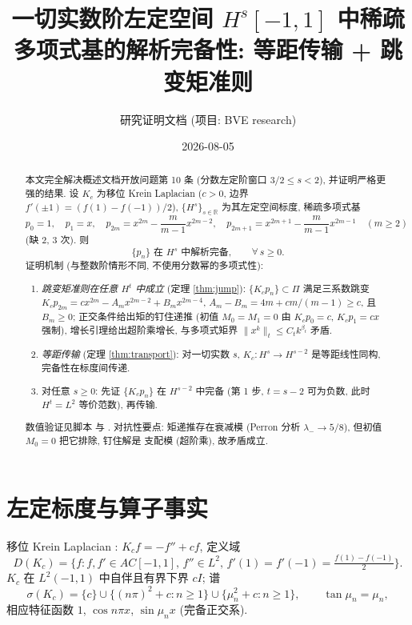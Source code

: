 \documentclass[UTF8]{ctexart}
\title{一切实数阶左定空间 $H^s[-1,1]$ 中稀疏多项式基的解析完备性: 等距传输 + 跳变矩准则}
\author{研究证明文档 (项目: BVE research)}
\date{2026-08-05}
\begin{document}
\maketitle

\begin{abstract}
本文完全解决概述文档开放问题第 10 条 (分数左定阶窗口 $3/2 \le s < 2$),
并证明严格更强的结果. 设 $K_c$ 为移位 Krein Laplacian ($c > 0$,
边界 $f'(\pm1) = (f(1)-f(-1))/2$), $\{H^s\}_{s \in \mathbb R}$ 为其左定空间标度,
稀疏多项式基
\[
	p_0 = 1, \quad p_1 = x, \quad
	p_{2m} = x^{2m} - \frac{m}{m-1}x^{2m-2}, \quad
	p_{2m+1} = x^{2m+1} - \frac{m}{m-1}x^{2m-1} \quad (m \ge 2)
\]
(缺 2, 3 次). 则
\begin{equation}
	\{p_n\} \text{ 在 } H^s \text{ 中解析完备}, \qquad \forall\, s \ge 0.
\end{equation}
证明机制 (与整数阶情形不同, 不使用分数幂的多项式性):
\begin{enumerate}
	\item \emph{跳变矩准则在任意 $H^t$ 中成立} (定理 \ref{thm:jump}):
		$\{K_c p_n\} \subset \Pi$ 满足三系数跳变
		$K_c p_{2m} = c x^{2m} - A_m x^{2m-2} + B_m x^{2m-4}$,
		$A_m - B_m = 4m + cm/(m-1) \ge c$, 且 $B_m \ge 0$;
		正交条件给出矩的钉住递推 (初值 $M_0 = M_1 = 0$ 由
		$K_c p_0 = c$, $K_c p_1 = cx$ 强制), 增长引理给出超阶乘增长,
		与多项式矩界 $\|x^k\|_t \le C_t k^{\beta_t}$ 矛盾.
	\item \emph{等距传输} (定理 \ref{thm:transport}): 对一切实数 $s$,
		$K_c: H^s \to H^{s-2}$ 是等距线性同构, 完备性在标度间传递.
	\item 对任意 $s \ge 0$: 先证 $\{K_c p_n\}$ 在 $H^{s-2}$ 中完备 (第 1 步,
		$t = s-2$ 可为负数, 此时 $H^t = L^2$ 等价范数), 再传输.
\end{enumerate}
数值验证见脚本  与
. 对抗性要点: 矩递推存在衰减模
(Perron 分析 $\lambda_- \to 5/8$), 但初值 $M_0 = 0$ 把它排除, 钉住解是
支配模 (超阶乘), 故矛盾成立.
\end{abstract}

\tableofcontents

\section{左定标度与算子事实}

移位 Krein Laplacian \cite{axioms}: $K_c f = -f'' + cf$, 定义域
\[
	D(K_c) = \bigl\{f : f, f' \in AC[-1,1],\, f'' \in L^2,\,
	f'(1) = f'(-1) = \tfrac{f(1)-f(-1)}{2}\bigr\}.
\]
$K_c$ 在 $L^2(-1,1)$ 中自伴且有界下界 $cI$; 谱
\[
	\sigma(K_c) = \{c\} \cup \{(n\pi)^2 + c : n \ge 1\}
	\cup \{\mu_n^2 + c : n \ge 1\}, \qquad \tan\mu_n = \mu_n,
\]
相应特征函数 $1$, $\cos n\pi x$, $\sin \mu_n x$ (完备正交系).
\end{document}
